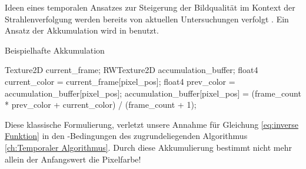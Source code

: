 Ideen eines temporalen Ansatzes zur Steigerung der Bildqualität im Kontext der Strahlenverfolgung werden bereits von 
aktuellen Untersuchungen verfolgt \cite{meyer2006statistical}. Ein Ansatz der Akkumulation wird in 
\cite{schied2017spatiotemporal} benutzt.

\begin{algorithm}[H]
    \caption{Beispielhafte Akkumulation}
    \begin{algorithmic}[1]
        \State Texture2D current\_frame;
        \State RWTexture2D accumulation\_buffer;
        \State float4 current\_color = current\_frame[pixel\_pos];
        \State float4 prev\_color = accumulation\_buffer[pixel\_pos];
        \State accumulation\_buffer[pixel\_pos] = (frame\_count * prev\_color + current\_color) / (frame\_count + 1);
    \end{algorithmic}
    \label{alg:TemporalAccumulation}
\end{algorithm}

Diese klassische Formulierung, verletzt unsere Annahme für Gleichung \ref{eq:inverse Funktion}
in den -Bedingungen des zugrundeliegenden Algorithmus 
\ref{ch:Temporaler Algorithmus}. Durch diese Akkumulierung bestimmt nicht mehr allein der 
Anfangswert die Pixelfarbe!